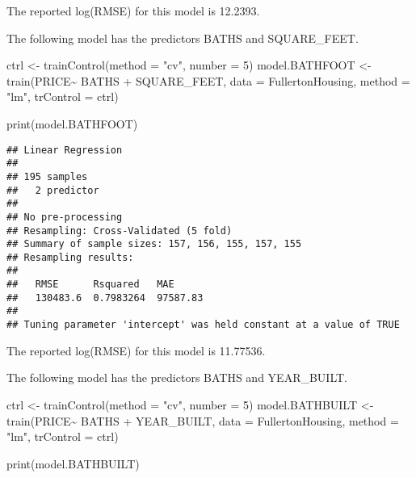 \documentclass[
]{article}
\newenvironment{Shaded}{\begin{snugshade}}{\end{snugshade}}
\newcommand{\AttributeTok}[1]{\textcolor[rgb]{0.77,0.63,0.00}{#1}}
\newcommand{\DecValTok}[1]{\textcolor[rgb]{0.00,0.00,0.81}{#1}}
\newcommand{\FunctionTok}[1]{\textcolor[rgb]{0.00,0.00,0.00}{#1}}
\newcommand{\NormalTok}[1]{#1}
\newcommand{\OtherTok}[1]{\textcolor[rgb]{0.56,0.35,0.01}{#1}}
\newcommand{\SpecialCharTok}[1]{\textcolor[rgb]{0.00,0.00,0.00}{#1}}
\newcommand{\StringTok}[1]{\textcolor[rgb]{0.31,0.60,0.02}{#1}}
\begin{document}
The reported log(RMSE) for this model is 12.2393.

The following model has the predictors BATHS and SQUARE\_FEET.

\begin{Shaded}
\begin{Highlighting}[]
\NormalTok{ctrl }\OtherTok{\textless{}{-}} \FunctionTok{trainControl}\NormalTok{(}\AttributeTok{method =} \StringTok{"cv"}\NormalTok{, }\AttributeTok{number =} \DecValTok{5}\NormalTok{)}
\NormalTok{model.BATHFOOT }\OtherTok{\textless{}{-}} \FunctionTok{train}\NormalTok{(PRICE}\SpecialCharTok{\textasciitilde{}}\NormalTok{ BATHS }\SpecialCharTok{+}\NormalTok{ SQUARE\_FEET, }
               \AttributeTok{data =}\NormalTok{ FullertonHousing, }\AttributeTok{method =} \StringTok{"lm"}\NormalTok{, }\AttributeTok{trControl =}\NormalTok{ ctrl)}

\FunctionTok{print}\NormalTok{(model.BATHFOOT)}
\end{Highlighting}
\end{Shaded}

\begin{verbatim}
## Linear Regression 
## 
## 195 samples
##   2 predictor
## 
## No pre-processing
## Resampling: Cross-Validated (5 fold) 
## Summary of sample sizes: 157, 156, 155, 157, 155 
## Resampling results:
## 
##   RMSE      Rsquared   MAE     
##   130483.6  0.7983264  97587.83
## 
## Tuning parameter 'intercept' was held constant at a value of TRUE
\end{verbatim}

The reported log(RMSE) for this model is 11.77536.

The following model has the predictors BATHS and YEAR\_BUILT.

\begin{Shaded}
\begin{Highlighting}[]
\NormalTok{ctrl }\OtherTok{\textless{}{-}} \FunctionTok{trainControl}\NormalTok{(}\AttributeTok{method =} \StringTok{"cv"}\NormalTok{, }\AttributeTok{number =} \DecValTok{5}\NormalTok{)}
\NormalTok{model.BATHBUILT }\OtherTok{\textless{}{-}} \FunctionTok{train}\NormalTok{(PRICE}\SpecialCharTok{\textasciitilde{}}\NormalTok{ BATHS }\SpecialCharTok{+}\NormalTok{ YEAR\_BUILT, }
               \AttributeTok{data =}\NormalTok{ FullertonHousing, }\AttributeTok{method =} \StringTok{"lm"}\NormalTok{, }\AttributeTok{trControl =}\NormalTok{ ctrl)}

\FunctionTok{print}\NormalTok{(model.BATHBUILT)}
\end{Highlighting}
\end{Shaded}
\end{document}
